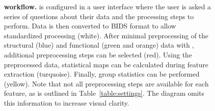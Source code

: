 \begin{figure}[!tb]
\begin{adjustwidth}{-1cm}{}
        \caption{\textbf{ workflow.}  is configured in a user interface where the user is asked a series of questions about their data and the processing steps to perform. Data is then converted to BIDS format \parencite{gorgolewski2016b} to allow standardized processing (white). After minimal preprocessing of the structural (blue) and functional (green and orange) data with  \parencite{esteban2019a}, additional preprocessing steps can be selected (red). Using the preprocessed data, statistical maps can be calculated during feature extraction (turquoise). Finally, group statistics can be performed (yellow). Note that not all preprocessing steps are available for each feature, as is outlined in Table~\ref{table:settings}. The diagram omits this information to increase visual clarity.}\label{fig:workflow}
  \end{adjustwidth}
\end{figure}
